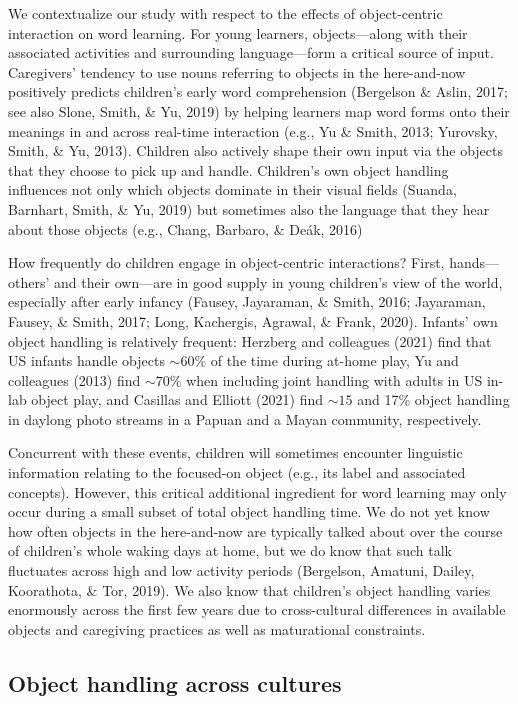 \documentclass[10pt, letterpaper]{article}
\begin{document}
We contextualize our study with respect to the effects of object-centric
interaction on word learning. For young learners, objects---along with
their associated activities and surrounding language---form a critical
source of input. Caregivers' tendency to use nouns referring to objects
in the here-and-now positively predicts children's early word
comprehension (Bergelson \& Aslin, 2017; see also Slone, Smith, \& Yu,
2019) by helping learners map word forms onto their meanings in and
across real-time interaction (e.g., Yu \& Smith, 2013; Yurovsky, Smith,
\& Yu, 2013). Children also actively shape their own input via the
objects that they choose to pick up and handle. Children's own object
handling influences not only which objects dominate in their visual
fields (Suanda, Barnhart, Smith, \& Yu, 2019) but sometimes also the
language that they hear about those objects (e.g., Chang, Barbaro, \&
Deák, 2016)

How frequently do children engage in object-centric interactions? First,
hands---others' and their own---are in good supply in young children's
view of the world, especially after early infancy (Fausey, Jayaraman, \&
Smith, 2016; Jayaraman, Fausey, \& Smith, 2017; Long, Kachergis,
Agrawal, \& Frank, 2020). Infants' own object handling is relatively
frequent: Herzberg and colleagues (2021) find that US infants handle
objects \({\sim}60\%\) of the time during at-home play, Yu and
colleagues (2013) find \({\sim}70\%\) when including joint handling with
adults in US in-lab object play, and Casillas and Elliott (2021) find
\({\sim}15\) and 17\% object handling in daylong photo streams in a
Papuan and a Mayan community, respectively.

Concurrent with these events, children will sometimes encounter
linguistic information relating to the focused-on object (e.g., its
label and associated concepts). However, this critical additional
ingredient for word learning may only occur during a small subset of
total object handling time. We do not yet know how often objects in the
here-and-now are typically talked about over the course of children's
whole waking days at home, but we do know that such talk fluctuates
across high and low activity periods (Bergelson, Amatuni, Dailey,
Koorathota, \& Tor, 2019). We also know that children's object handling
varies enormously across the first few years due to cross-cultural
differences in available objects and caregiving practices as well as
maturational constraints.

\hypertarget{object-handling-across-cultures}{%
\subsection{Object handling across
cultures}\label{object-handling-across-cultures}}
\end{document}
